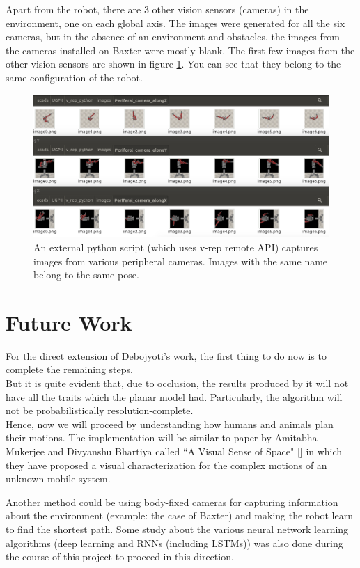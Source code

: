 \documentclass[12pt]{article}
\begin{document}
Apart from the robot, there are 3 other vision sensors (cameras) in the environment, one on each global axis. The images were generated for all the six cameras, but in the absence of an environment and obstacles, the images from the cameras installed on Baxter were mostly blank. The first few images from the other vision sensors are shown in figure \ref{Baxter}. You can see that they belong to the same configuration of the robot.

\begin{figure}
  \includegraphics[width=\columnwidth]{Baxter}
  \caption{An external python script (which uses v-rep remote API) captures images from various peripheral cameras. Images with the same name belong to the same pose.}
  \label{Baxter}
\end{figure}

\section{Future Work}
For the direct extension of Debojyoti's work, the first thing to do now is to complete the remaining steps.\\ But it is quite evident that, due to occlusion, the results produced by it will not have all the traits which the planar model had. Particularly, the algorithm will not be probabilistically resolution-complete.\\
Hence, now we will proceed by understanding how humans and animals plan their motions. The implementation will be similar to paper by Amitabha Mukerjee and Divyanshu Bhartiya called ``A Visual Sense of Space" [\cite{bica}] in which they have proposed a visual characterization for the complex motions of an unknown
mobile system.

Another method could be using body-fixed cameras for capturing information about the environment (example: the case of Baxter) and making the robot learn to find the shortest path. Some study about the various neural network learning algorithms (deep learning and RNNs (including LSTMs)) was also done during the course of this project to proceed in this direction.
\end{document}
